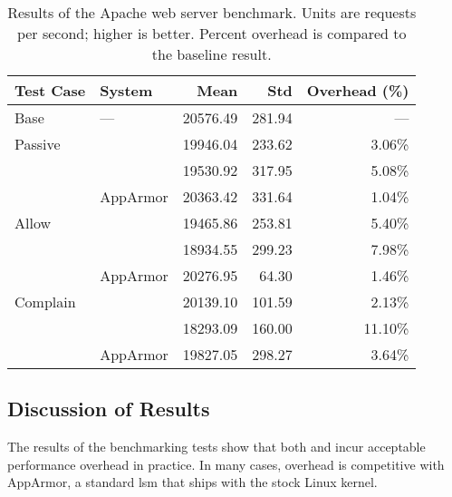 \begingroup\small
\begin{longtable}[c]{llrrr}
  \caption[TODO]{
    Results of the Apache web server benchmark. Units are requests per second; higher is
    better. Percent overhead is compared to the baseline result.
  }%
  \label{tab:phoronix-apache}\\
  \toprule
   Test Case & System         &  Mean   & Std   & Overhead (\%)\\
   \midrule
   Base      & ---            & 20576.49 & 281.94 & ---     \\
   \midrule
   Passive   & \bpfbox{}      & 19946.04 & 233.62 &  3.06\% \\
             & \bpfcontain{}  & 19530.92 & 317.95 &  5.08\% \\
             & AppArmor       & 20363.42 & 331.64 &  1.04\% \\
   \midrule
   Allow     & \bpfbox{}      & 19465.86 & 253.81 &  5.40\% \\
             & \bpfcontain{}  & 18934.55 & 299.23 &  7.98\% \\
             & AppArmor       & 20276.95 &  64.30 &  1.46\% \\
   \midrule
   Complain  & \bpfbox{}      & 20139.10 & 101.59 &  2.13\% \\
             & \bpfcontain{}  & 18293.09 & 160.00 & 11.10\% \\
             & AppArmor       & 19827.05 & 298.27 &  3.64\% \\
  \bottomrule
\end{longtable}
\endgroup


\subsection{Discussion of Results}%
\label{ss:eval-performance-discussion}

The results of the benchmarking tests show that both \bpfbox{} and \bpfcontain{} incur
acceptable performance overhead in practice. In many cases, overhead is competitive with
AppArmor, a standard \gls{lsm} that ships with the stock Linux kernel. 

